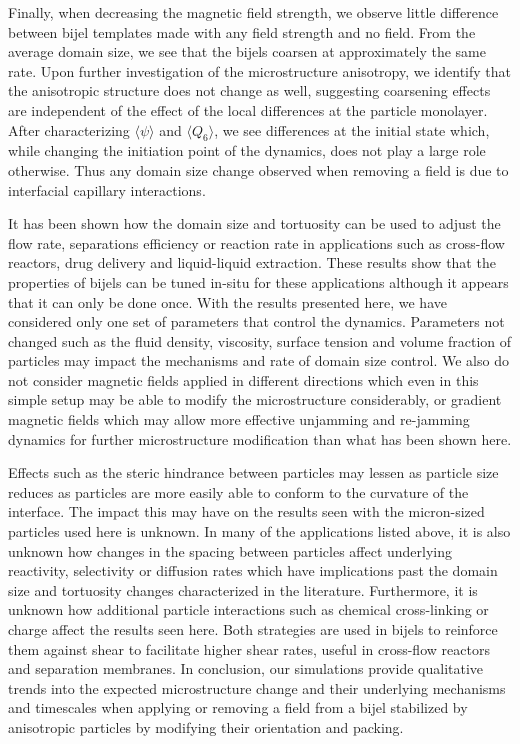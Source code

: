 Finally, when decreasing the magnetic field strength, we observe little difference between bijel templates made with any field strength and no field. From the average domain 
size, we see that the bijels coarsen at approximately the same rate. Upon further investigation of the microstructure anisotropy, we identify that the anisotropic structure 
does not change as well, suggesting coarsening effects are independent of the effect of the local differences at the particle monolayer. After characterizing 
$\langle \psi \rangle$ and $\langle Q_6 \rangle$, we see differences at the initial state which, while changing the initiation point of the dynamics, does not play a large
 role otherwise. Thus any domain size change observed when removing a field is due to interfacial capillary interactions. 

It has been shown how the domain size and tortuosity can be used to adjust the flow rate, separations efficiency or reaction rate in applications such as cross-flow reactors, 
drug delivery and liquid-liquid extraction. These results show that the properties of bijels can be tuned in-situ for these applications although it appears that it can only 
be done once. With the results presented here, we have considered only one set of parameters that control the dynamics. Parameters not changed such as the fluid density, 
viscosity, surface tension and volume fraction of particles may impact the mechanisms and rate of domain size control. We also do not consider magnetic 
fields applied in different directions which even in this simple setup may be able to modify the microstructure considerably, or gradient magnetic fields which may allow 
more effective unjamming and re-jamming dynamics for further microstructure modification than what has been shown here.

Effects such as the steric hindrance between particles may lessen as particle size reduces as particles are more easily able to conform to the curvature of the interface. 
The impact this may have on the results seen with the micron-sized particles used here is unknown. In many of the applications listed above, it is also unknown how changes 
in the spacing between particles affect underlying reactivity, selectivity or diffusion rates which have implications past the domain size and tortuosity changes characterized 
in the literature. Furthermore, it is unknown how additional particle interactions such as chemical cross-linking or charge affect the results seen here. Both strategies are 
used in bijels to reinforce them against shear to facilitate higher shear rates, useful in cross-flow reactors and separation membranes. In conclusion, our simulations provide 
qualitative trends into the expected microstructure change and their underlying mechanisms and timescales when applying or removing a field from a bijel stabilized by 
anisotropic particles by modifying their orientation and packing.